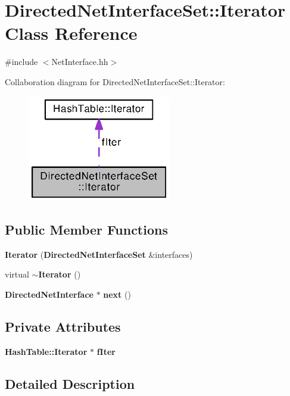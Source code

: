 \section{Directed\+Net\+Interface\+Set\+:\+:Iterator Class Reference}
\label{classDirectedNetInterfaceSet_1_1Iterator}


{\ttfamily \#include $<$Net\+Interface.\+hh$>$}



Collaboration diagram for Directed\+Net\+Interface\+Set\+:\+:Iterator\+:
\nopagebreak
\begin{figure}[H]
\begin{center}
\leavevmode
\includegraphics[width=177pt]{classDirectedNetInterfaceSet_1_1Iterator__coll__graph}
\end{center}
\end{figure}
\subsection*{Public Member Functions}
\begin{DoxyCompactItemize}
\item 
{\bf Iterator} ({\bf Directed\+Net\+Interface\+Set} \&interfaces)
\item 
virtual {\bf $\sim$\+Iterator} ()
\item 
{\bf Directed\+Net\+Interface} $\ast$ {\bf next} ()
\end{DoxyCompactItemize}
\subsection*{Private Attributes}
\begin{DoxyCompactItemize}
\item 
{\bf Hash\+Table\+::\+Iterator} $\ast$ {\bf f\+Iter}
\end{DoxyCompactItemize}


\subsection{Detailed Description}


